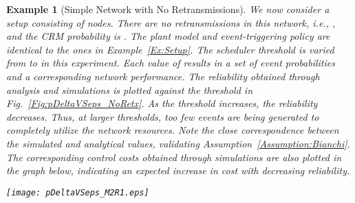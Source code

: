 \documentclass[journal]{IEEEtran}
\newtheorem{example}{Example}[section]
\begin{document}
\begin{example}[Simple Network with No Retransmissions] \label{Ex:NoRetx}
We now consider a setup consisting of  nodes. There are no retransmissions in this network, i.e., , and the CRM probability is . The plant model and event-triggering policy are identical to the ones in Example~\ref{Ex:Setup}. The scheduler threshold is varied from  to  in this experiment. Each value of  results in a set of event probabilities and a corresponding network performance. The reliability  obtained through analysis and simulations is plotted against the threshold in Fig.~\ref{Fig:pDeltaVSeps_NoRetx}. As the threshold increases, the reliability decreases. Thus, at larger thresholds, too few events are being generated to completely utilize the network resources. Note the close correspondence between the simulated and analytical values, validating Assumption~\ref{Assumption:Bianchi}. The corresponding control costs obtained through simulations are also plotted in the graph below, indicating an expected increase in cost with decreasing reliability.

\begin{figure*}[tb]
\begin{center}
\texttt{[image: pDeltaVSeps\_M2R1.eps]}
\caption{A comparison of the analytical and simulated values of the reliability versus the event-triggering threshold, in a simple network with no retransmissions in the CRM. The close correspondence of these values validates Assumption~\ref{Assumption:Bianchi} and the results of Theorem~\ref{Theorem:SteadyStateAnalysis}.} \label{Fig:pDeltaVSeps_NoRetx}
\end{center}
\end{figure*}
\end{example}
\end{document}
